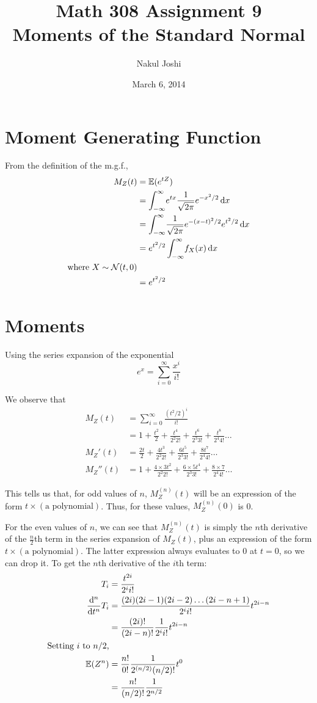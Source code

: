 \documentclass[twocolumn]{article}
\title{Math 308 Assignment 9\\Moments of the Standard Normal}
\author{Nakul Joshi}
\date{March 6, 2014}
\newcommand{\sfrac}[2]{
	\frac{#1}{
	2^{#2} #2!
	}
}
\begin{document}
\maketitle

\section{Moment Generating Function}
From the definition of the m.g.f.,\begin{align*}
M_Z(t)&=\mathbb{E}(e^{tZ})\\
&=\int_{-\infty}^{\infty} \! 
	e^{tx} \frac{1}{\sqrt{2\pi}} e^{-x^2/2}
	 \, \mathrm{d} x\\
&=\int_{-\infty}^{\infty} \! 
	\frac{1}{\sqrt{2\pi}} e^{-(x-t)^2/2} e^{t^2/2}
	 \, \mathrm{d} x\\
&=e^{t^2/2}\int_{-\infty}^{\infty} \! 
	f_X(x)
	 \, \mathrm{d} x\\
\text{where $X \sim \mathcal{N}(t,0)$}\\
&=e^{t^2/2}
\end{align*}

\section{Moments}
Using the series expansion of the exponential\[
e^x=\sum_{i=0}^\infty \frac{x^i}{i!}
\]

We observe that \begin{align*}
M_Z(t)	&= \sum_{i=0}^\infty \frac{(t^2/2)^i}{i!} \\
		&= 1+\frac{t^2}{2}+\sfrac{t^4}{2}+\sfrac{t^6}{3}+\sfrac{t^8}{4} \ldots\\
M_Z'(t)	&= \frac{2t}{2} + \sfrac{4t^3}{2} + \sfrac{6t^5}{3}+\sfrac{8t^7}{4} \ldots\\
M_Z''(t)&= 1+\sfrac{4\times 3t^2}{2}+\sfrac{6\times 5t^4}{3}+\sfrac{8\times 7}{4} \ldots
\end{align*}

\newpage

This tells us that, for odd values of $n$, $M_Z^{(n)}(t)$ will be an expression of the form $t\times (\text{a polynomial})$. Thus, for these values, $M_Z^{(n)}(0)$ is 0.

For the even values of $n$, we can see that $M_Z^{(n)}(t)$ is simply the $n$th derivative of the $\frac{n}{2}$th term in the series expansion of $M_Z(t)$, plus an expression of the form $t\times (\text{a polynomial})$. The latter expression always evaluates to 0 at $t=0$, so we can drop it. To get the $n$th derivative of the $i$th term: \begin{align*}
	T_i &=\sfrac{t^{2i}}{i}\\
	\der{n}{t} T_i &= \sfrac{(2i)(2i-1)(2i-2)\ldots(2i-n+1)}{i} t^{2i-n}\\
	&=\frac{(2i)!}{(2i-n)!}\sfrac{1}{i}t^{2i-n}\\
	\text{Setting $i$ to $n/2$,}\\
	\ev{Z^n}&=\frac{n!}{0!}\sfrac{1}{(n/2)}t^0\\
	&=\frac{n!}{(n/2)!}\frac{1}{2^{n/2}}\\
\end{align*}
\end{document}

